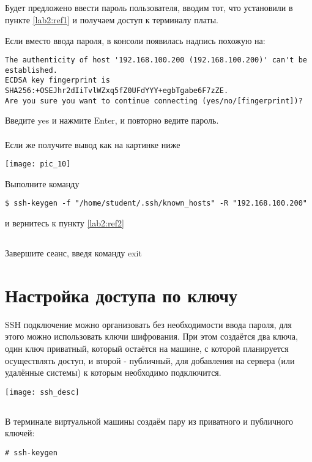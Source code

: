 \subsection{}Будет предложено ввести пароль пользователя, вводим тот, что установили в пункте \ref{lab2:ref1} и получаем доступ к терминалу платы.

Если вместо ввода пароля, в консоли появилась надпись похожую на:
\begin{lstlisting}[style=stdout]
The authenticity of host '192.168.100.200 (192.168.100.200)' can't be established.
ECDSA key fingerprint is SHA256:+OSEJhr2dIiTvlWZxq5fZ0UFdYYY+egbTgabe6F7zZE.
Are you sure you want to continue connecting (yes/no/[fingerprint])?
\end{lstlisting}
Введите yes и нажмите Enter, и повторно ведите пароль.
\\\\
Если же получите вывод как на картинке ниже
\begin{center}
	\texttt{[image: pic\_10]}
\end{center}
Выполните команду 
\begin{lstlisting}[style=bash]
$ ssh-keygen -f "/home/student/.ssh/known_hosts" -R "192.168.100.200"
\end{lstlisting}
и вернитесь к пункту \ref{lab2:ref2}

\subsection{}Завершите сеанс, введя команду exit 

\section{Настройка доступа по ключу}

SSH подключение можно организовать без необходимости ввода пароля, для этого можно использовать ключи шифрования. При этом создаётся два ключа, один ключ приватный, который остаётся на машине, с которой планируется осуществлять доступ, и второй - публичный, для добавления на сервера (или удалённые системы) к которым необходимо подключится.
\begin{center}
	\texttt{[image: ssh\_desc]}
\end{center}

\subsection{}В терминале виртуальной машины создаём пару из приватного и публичного ключей:
\begin{lstlisting}[style=bash]
# ssh-keygen
\end{lstlisting}

